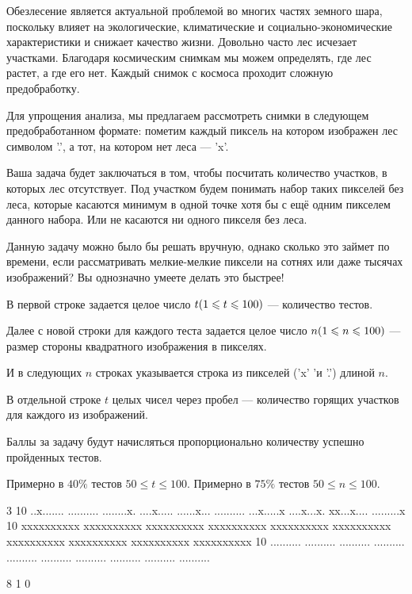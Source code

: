 
Обезлесение является актуальной проблемой во многих частях земного шара, поскольку влияет на 
экологические, климатические и социально-экономические характеристики и снижает качество жизни. 
Довольно часто лес исчезает участками. Благодаря космическим снимкам мы можем определять, 
где лес растет, а где его нет. Каждый снимок с космоса проходит сложную предобработку. 

Для упрощения анализа, мы предлагаем рассмотреть снимки в следующем предобработанном формате: 
пометим каждый пиксель на котором изображен лес символом '.', а тот, на котором нет леса — 'x'.

Ваша задача будет заключаться в том, чтобы посчитать количество участков, в которых лес отсутствует. 
Под участком будем понимать набор таких пикселей без леса, которые касаются минимум в одной точке хотя 
бы с ещё одним пикселем данного набора. Или не касаются ни одного пикселя без леса.

Данную задачу можно было бы решать вручную, однако сколько это займет по времени, если рассматривать 
мелкие-мелкие пиксели на сотнях или даже тысячах изображений? Вы однозначно умеете делать это быстрее!

В первой строке задается целое число $t \space (1 \leq t \leq 100)$  — количество тестов.

Далее с новой строки для каждого теста задается целое число $n\space (1 \leq n \leq 100)$  — размер стороны 
квадратного изображения в пикселях.

И в следующих $n$ строках указывается строка из пикселей ('x' 'и '.') длиной $n$.

\outputfmtSection
В отдельной строке $ t $ целых чисел через пробел — количество горящих участков для каждого из изображений.

\markSection

Баллы за задачу будут начисляться пропорционально количеству успешно пройденных тестов.

Примерно в $40\%$  тестов $50 \leq t \leq 100$.  
Примерно в $75\%$  тестов $50 \leq n \leq 100$. 


\begin{myverbbox}[\small]{\vinput}
3
10
..x.......
..........
........x.
....x.....
......x...
..........
...x.....x
....x...x.
xx...x....
.........x
10
xxxxxxxxxx
xxxxxxxxxx
xxxxxxxxxx
xxxxxxxxxx
xxxxxxxxxx
xxxxxxxxxx
xxxxxxxxxx
xxxxxxxxxx
xxxxxxxxxx
xxxxxxxxxx
10
..........
..........
..........
..........
..........
..........
..........
..........
..........
..........
\end{myverbbox}

\begin{myverbbox}[\small]{\voutput}
8 1 0 
\end{myverbbox}

